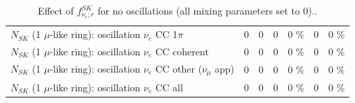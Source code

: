 \begin{table}
\begin{tabular}{| l | r | r | r  r | r  r |}
                     $N_{SK}$ (1 $\mu$-like ring): oscillation $\nu_e$ CC 1$\pi$ &               0 &               0 &               0 &        0 \%  &               0 &        0 \%  \\ 
                   $N_{SK}$ (1 $\mu$-like ring): oscillation $\nu_e$ CC coherent &               0 &               0 &               0 &        0 \%  &               0 &        0 \%  \\ 
      $N_{SK}$ (1 $\mu$-like ring): oscillation $\nu_e$ CC other ($\nu_\mu$ app) &               0 &               0 &               0 &        0 \%  &               0 &        0 \%  \\ 
                       $N_{SK}$ (1 $\mu$-like ring): oscillation $\nu_e$  CC all &               0 &               0 &               0 &        0 \%  &               0 &        0 \%  \\ 
\hline
\hline
\end{tabular}
\caption{ Effect of $f_{\nu_e; r}^{SK}$ for no oscillations (all mixing parameters set to 0).. }
\label{tab:num_sk_1Rmu_nuecc_eff_1RmuT_3f_osc_t13:0}
\end{table}
\clearpage
